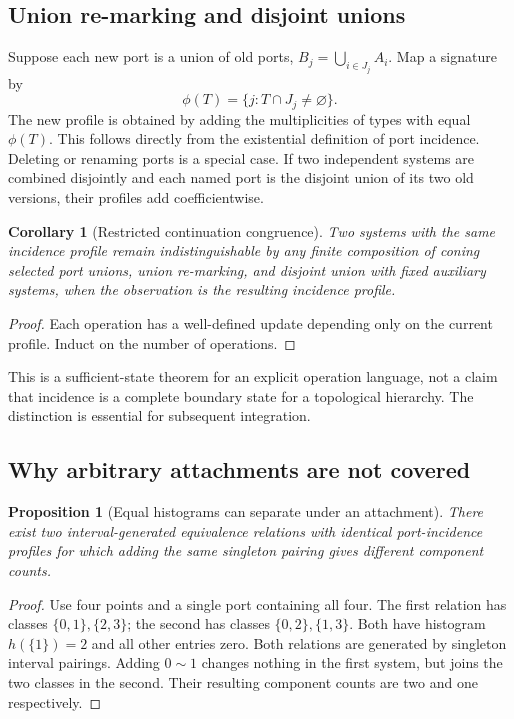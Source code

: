 \documentclass[11pt]{article}
\newtheorem{proposition}[theorem]{Proposition}
\newtheorem{corollary}[theorem]{Corollary}
\theoremstyle{definition}
\begin{document}
\subsection{Union re-marking and disjoint unions}
Suppose each new port is a union of old ports,
$B_j=\bigcup_{i\in J_j}A_i$. Map a signature by
\begin{equation}
 \phi(T)=\{j:T\cap J_j\neq\varnothing\}.
 \label{eq:relabel}
\end{equation}
The new profile is obtained by adding the multiplicities of types with
equal $\phi(T)$. This follows directly from the existential definition of
port incidence. Deleting or renaming ports is a special case. If two
independent systems are combined disjointly and each named port is the
disjoint union of its two old versions, their profiles add coefficientwise.

\begin{corollary}[Restricted continuation congruence]
Two systems with the same incidence profile remain indistinguishable by
any finite composition of coning selected port unions, union re-marking,
and disjoint union with fixed auxiliary systems, when the observation is
the resulting incidence profile.
\end{corollary}
\begin{proof}
Each operation has a well-defined update depending only on the current
profile. Induct on the number of operations.
\end{proof}

This is a sufficient-state theorem for an explicit operation language,
not a claim that incidence is a complete boundary state for a topological
hierarchy. The distinction is essential for subsequent integration.

\subsection{Why arbitrary attachments are not covered}
\begin{proposition}[Equal histograms can separate under an attachment]
\label{prop:attachment}
There exist two interval-generated equivalence relations with identical
port-incidence profiles for which adding the same singleton pairing gives
different component counts.
\end{proposition}
\begin{proof}
Use four points and a single port containing all four. The first relation
has classes $\{0,1\},\{2,3\}$; the second has classes
$\{0,2\},\{1,3\}$. Both have histogram $h(\{1\})=2$ and all other entries
zero. Both relations are generated by singleton interval pairings. Adding
$0\sim1$ changes nothing in the first system, but joins the two classes in
the second. Their resulting component counts are two and one respectively.
\end{proof}
\end{document}

